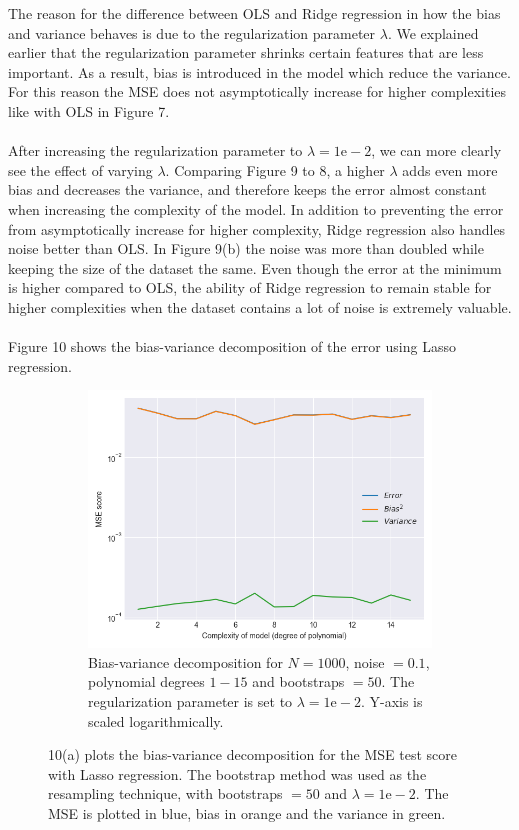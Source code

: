 \documentclass[a4paper,twocolumn]{article}
\begin{document}
The reason for the difference between OLS and Ridge regression in how the bias and variance behaves is due to the regularization parameter $\lambda$. We explained earlier that the regularization parameter shrinks certain features that are less important. As a result, bias is introduced in the model which reduce the variance. For this reason the MSE does not asymptotically increase for higher complexities like with OLS in Figure 7. \\
\\
After increasing the regularization parameter to $\lambda = 1\textrm{e}-2$, we can more clearly see the effect of varying $\lambda$. Comparing Figure 9 to 8, a higher $\lambda$ adds even more bias and decreases the variance, and therefore keeps the error almost constant when increasing the complexity of the model. In addition to preventing the error from asymptotically increase for higher complexity, Ridge regression also handles noise better than OLS. In Figure 9(b) the noise was more than doubled while keeping the size of the dataset the same. Even though the error at the minimum is higher compared to OLS, the ability of Ridge regression to remain stable for higher complexities when the dataset contains a lot of noise is extremely valuable.\\
\\
Figure 10 shows the bias-variance decomposition of the error using Lasso regression. 
\begin{figure}[ht]
    \centering
    \begin{subfigure}[b]{0.9\columnwidth}
        \includegraphics[width=\columnwidth]{bias_variance_tradeoff_lasso_Lambda=0.01_Bootstraps=50_N=1000_Noise=0.1_Degree=1-15.png}
        \caption{Bias-variance decomposition for $N = 1000$, noise $= 0.1$, polynomial degrees $1- 15$ and bootstraps $= 50$. The regularization parameter is set to $\lambda = 1\textrm{e}-2$. Y-axis is scaled logarithmically.}
    \end{subfigure}
    \caption{10(a) plots the bias-variance decomposition for the MSE test score with Lasso regression. The bootstrap method was used as the resampling technique, with bootstraps $= 50$ and $\lambda = 1\textrm{e}-2$. The MSE is plotted in blue, bias in orange and the variance in green. }
\end{figure}\\
\end{document}
